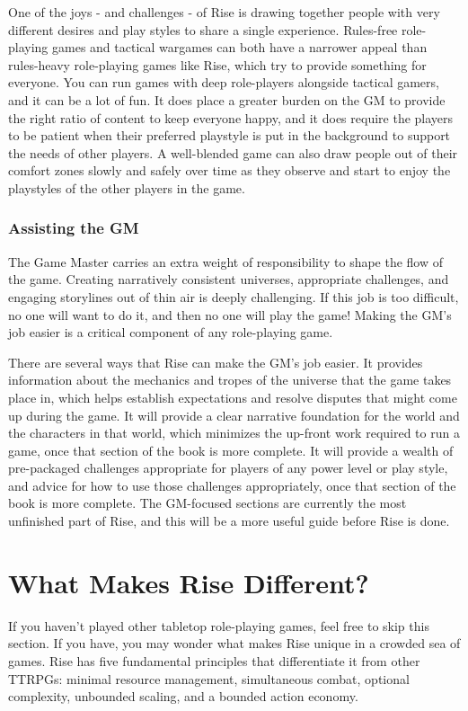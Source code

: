       One of the joys - and challenges - of Rise is drawing together people with very different desires and play styles to share a single experience.
      Rules-free role-playing games and tactical wargames can both have a narrower appeal than rules-heavy role-playing games like Rise, which try to provide something for everyone.
      You can run games with deep role-players alongside tactical gamers, and it can be a lot of fun.
      It does place a greater burden on the GM to provide the right ratio of content to keep everyone happy, and it does require the players to be patient when their preferred playstyle is put in the background to support the needs of other players.
      A well-blended game can also draw people out of their comfort zones slowly and safely over time as they observe and start to enjoy the playstyles of the other players in the game.

    \subsubsection{Assisting the GM}
      The Game Master carries an extra weight of responsibility to shape the flow of the game.
      Creating narratively consistent universes, appropriate challenges, and engaging storylines out of thin air is deeply challenging.
      If this job is too difficult, no one will want to do it, and then no one will play the game!
      Making the GM's job easier is a critical component of any role-playing game.

      There are several ways that Rise can make the GM's job easier.
      It provides information about the mechanics and tropes of the universe that the game takes place in, which helps establish expectations and resolve disputes that might come up during the game.
      It will provide a clear narrative foundation for the world and the characters in that world, which minimizes the up-front work required to run a game, once that section of the book is more complete.
      It will provide a wealth of pre-packaged challenges appropriate for players of any power level or play style, and advice for how to use those challenges appropriately, once that section of the book is more complete.
      The GM-focused sections are currently the most unfinished part of Rise, and this will be a more useful guide before Rise is done.

\section{What Makes Rise Different?}
  If you haven't played other tabletop role-playing games, feel free to skip this section.
  If you have, you may wonder what makes Rise unique in a crowded sea of games.
  Rise has five fundamental principles that differentiate it from other TTRPGs: minimal resource management, simultaneous combat, optional complexity, unbounded scaling, and a bounded action economy.

